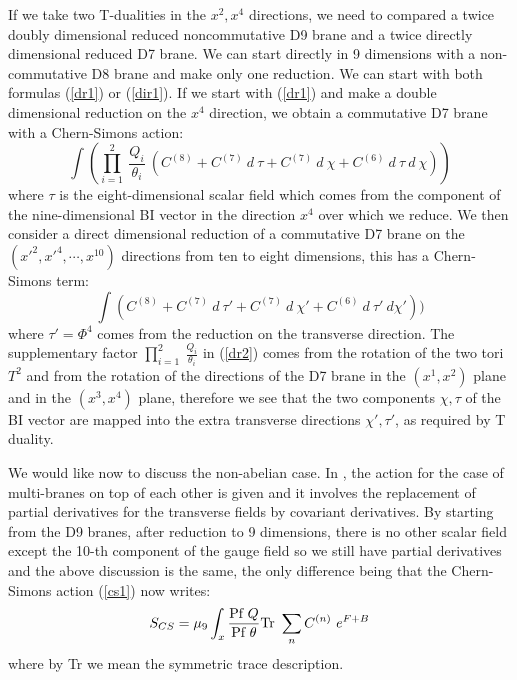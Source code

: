 \documentclass[a4paper,12pt]{article}
\begin{document}
If we take two T-dualities in the $x^2, x^4$ directions, we need to compared
a twice doubly dimensional reduced noncommutative D9 brane and a twice 
directly dimensional reduced D7 brane. We can start directly in 9 dimensions 
with a non-commutative D8 brane and make only one reduction. We can start with
both formulas (\ref{dr1}) or (\ref{dir1}). If we start with  (\ref{dr1}) and
make a double dimensional reduction on the $x^4$ direction, we obtain a 
commutative D7 brane with a Chern-Simons action:
\begin{equation}
\label{dr2}
\int (\prod_{i=1}^{2}
~\frac{Q_i}{\theta_i}~(C^{(8)} + C^{(7)}~d~\tau + C^{(7)}~d~\chi + 
C^{(6)}~d~\tau~d~\chi))
\end{equation}
where $\tau$ is the eight-dimensional scalar field which comes from the
component of the nine-dimensional BI vector in the direction $x^4$ over which
we reduce.
We then consider a direct dimensional reduction of a commutative 
D7 brane on the $(x'^{2}, x'^{4},\cdots,x^{10})$ directions from ten to eight 
dimensions, this has a Chern-Simons term:
\begin{equation}
\label{dir2}
\int (C^{(8)} + C^{(7)}~d~\tau' + C^{(7)}~d~\chi' + 
C^{(6)}~d~\tau'~d \chi'))
\end{equation}
where $\tau' = \Phi^{4}$ comes from the reduction on the transverse direction.
The supplementary factor $\prod_{i=1}^{2}~\frac{Q_i}{\theta_i}$ 
in (\ref{dr2}) comes from the rotation of the two tori $T^2$ and from 
the rotation of the directions of the D7 brane in the $(x^1,x^2)$ plane and
in the $(x^3, x^4)$ plane, therefore we see that the two components
$\chi, \tau$ of the BI vector are mapped into the extra transverse directions
$\chi', \tau'$, as required by T duality.

We would like now to discuss the non-abelian case. In \cite{jm,mye1}, the
action for the case of multi-branes on top of each other is given and it
involves the replacement of partial derivatives for the transverse fields by
covariant derivatives. By starting from the D9 branes, after reduction to 9
dimensions, there is no other scalar field except the 10-th component of the
gauge field so we still have partial derivatives and the above discussion is
the same, the only difference being that the Chern-Simons action 
(\ref{cs1}) now writes:
\begin{equation}
\label{cs6}
 S_{CS} = \mu_9 \int_x {\mbox{Pf}~Q\over \mbox{Pf}~\theta}
\mbox{Tr}~\sum_n C^{(n)}~e^{F + B} 
\end{equation}
where by Tr we mean the symmetric trace description.
\end{document}
